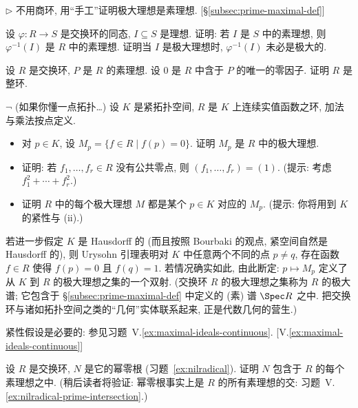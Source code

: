 \begin{prob}
\label{ex:maximal-prime-hand}
$\triangleright$ 不用商环, 用``手工''证明极大理想是素理想. [\S\ref{subsec:prime-maximal-def}]
\end{prob}

\begin{prob}
\label{ex:preimage-prime}
设 $\varphi : R \to S$ 是交换环的同态, $I \subseteq S$ 是理想. 证明: 若 $I$ 是 $S$ 中的素理想, 则 $\varphi^{-1}(I)$ 是 $R$ 中的素理想. 证明当 $I$ 是极大理想时, $\varphi^{-1}(I)$ 未必是极大的.
\end{prob}

\begin{prob}
\label{ex:prime-no-zero-divisors}
设 $R$ 是交换环, $P$ 是 $R$ 的素理想. 设 $0$ 是 $R$ 中含于 $P$ 的唯一的零因子. 证明 $R$ 是整环.
\end{prob}

\begin{prob}
\label{ex:continuous-functions}
$\neg$ (如果你懂一点拓扑\ldots) 设 $K$ 是紧拓扑空间, $R$ 是 $K$ 上连续实值函数之环, 加法与乘法按点定义.
\begin{itemize}
	\item[(i)] 对 $p \in K$, 设 $M_p = \{f \in R \mid f(p) = 0\}$. 证明 $M_p$ 是 $R$ 中的极大理想.
	\item[(ii)] 证明: 若 $f_1, \ldots, f_r \in R$ 没有公共零点, 则 $(f_1, \ldots, f_r) = (1)$. (提示: 考虑 $f_1^2 + \cdots + f_r^2$.)
	\item[(iii)] 证明 $R$ 中的每个极大理想 $M$ 都是某个 $p \in K$ 对应的 $M_p$. (提示: 你将用到 $K$ 的紧性与 (ii).)
\end{itemize}
若进一步假定 $K$ 是 Hausdorff 的 (而且按照 Bourbaki 的观点, 紧空间自然是 Hausdorff 的), 则 Urysohn 引理表明对 $K$ 中任意两个不同的点 $p \neq q$, 存在函数 $f \in R$ 使得 $f(p) = 0$ 且 $f(q) = 1$. 若情况确实如此, 由此断定: $p \mapsto M_p$ 定义了从 $K$ 到 $R$ 的极大理想之集的一个双射. (交换环 $R$ 的极大理想之集称为 $R$ 的极大谱; 它包含于 \S\ref{subsec:prime-maximal-def} 中定义的 (素) 谱 $\Spec R$ 之中. 把交换环与诸如拓扑空间之类的``几何''实体联系起来, 正是代数几何的营生.)

紧性假设是必要的: 参见习题~V.\ref{ex:maximal-ideals-continuous}. [V.\ref{ex:maximal-ideals-continuous}]
\end{prob}

\begin{prob}
\label{ex:nilradical-prime}
设 $R$ 是交换环, $N$ 是它的幂零根 (习题~\ref{ex:nilradical}). 证明 $N$ 包含于 $R$ 的每个素理想之中. (稍后读者将验证: 幂零根事实上是 $R$ 的所有素理想的交: 习题~V.\ref{ex:nilradical-prime-intersection}.)
\end{prob}

